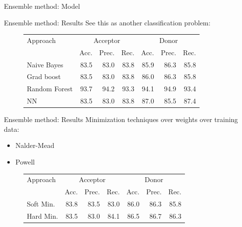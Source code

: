 \documentclass[10pt]{beamer}
\begin{document}
\begin{frame}{Ensemble method: Model}
\begin{figure}[ht]
	\end{figure}
\end{frame}

\begin{frame}{Ensemble method: Results}
	See this as another classification problem:
	\begin{figure}
		\small
		\centering
		\begingroup
		\def\arraystretch{1.2}
		\begin{tabular}{|l|r|r|r|r|r|r|}
			\hline
			Approach  & \multicolumn{3}{c|}{Acceptor} & \multicolumn{3}{c|}{Donor} \\
			\cline{2-7}
			& Acc. & Prec. & Rec. & Acc. & Prec. & Rec. \\
			\hline
			Naive Bayes & 83.5 & 83.0 & 83.8 & 85.9 & 86.3 & 85.8 \\
			Grad boost & 83.5 & 83.0 & 83.8 & 86.0 & 86.3 & 85.8 \\
			Random Forest & 93.7 & 94.2 & 93.3 & 94.1 & 94.9 & 93.4 \\
			NN & 83.5 & 83.0 &83.8 & 87.0 & 85.5 & 87.4 \\
			\hline
			
		\end{tabular}
		\endgroup
	\end{figure}
\end{frame}

\begin{frame}{Ensemble method: Results}
	Minimization techniques over weights over training data:
	\begin{itemize}
		\item Nalder-Mead
		\item Powell
	\end{itemize}
	\pause
	\begin{figure}
		\small
		\centering
		\begingroup
		\def\arraystretch{1.2}
		\begin{tabular}{|l|r|r|r|r|r|r|}
			\hline
			Approach  & \multicolumn{3}{c|}{Acceptor} & \multicolumn{3}{c|}{Donor} \\
			\cline{2-7}
			& Acc. & Prec. & Rec. & Acc. & Prec. & Rec. \\
			\hline
			Soft Min. & 83.8 & 83.5 & 83.0 & 86.0 & 86.3 & 85.8 \\
			Hard Min. & 83.5 & 83.0 & 84.1 & 86.5 & 86.7 & 86.3 \\
			\hline
		\end{tabular}
		\endgroup
	\end{figure}
\end{frame}
\end{document}
